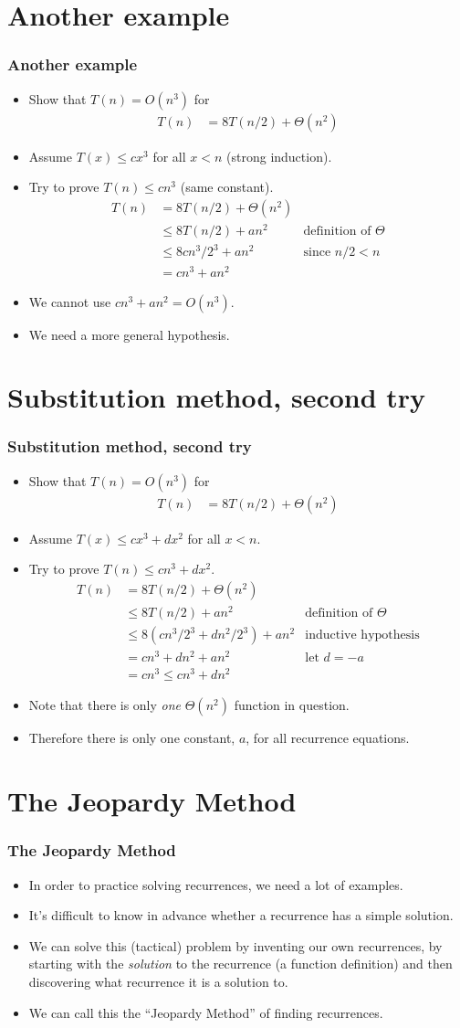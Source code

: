 \documentclass{beamer}
\newcommand{\sect}[1]{
\section{#1}
\begin{frame}[fragile]\frametitle{#1}
}
\newcommand{\bi}{\begin{itemize}}
\newcommand{\ii}{\item}
\newcommand{\ei}{\end{itemize}}
\begin{document}
\sect{Another example}
\bi
\ii
Show that $T(n) = O(n^3)$ for
\begin{align*}
  T(n) &= 8T(n/2) + \Theta(n^2)
\end{align*}
\ii
Assume $T(x) \leq cx^3$ for all $x<n$ (strong induction).
\ii
Try to prove $T(n) \leq cn^3$ (same constant).
\begin{align*}
  T(n) &= 8T(n/2) + \Theta(n^2)\\
  &\leq  8T(n/2) + an^2  &\mbox{definition of $\Theta$}\\
  &\leq 8cn^3/2^3 +  an^2 & \mbox{since $n/2 < n$}\\
  &= cn^3 +  an^2
\end{align*}
\ii
We cannot use $cn^3 +  an^2 = O(n^3)$.
\ii
We need a more general hypothesis.
\ei
\end{frame}

\sect{Substitution method, second try}
\bi
\ii
Show that $T(n) = O(n^3)$ for
\begin{align*}
  T(n) &= 8T(n/2) + \Theta(n^2)
\end{align*}
\ii
Assume $T(x) \leq cx^3 + dx^2$ for all $x<n$.
\ii
Try to prove $T(n) \leq cn^3 + dx^2$.
\begin{align*}
  T(n) &= 8T(n/2) + \Theta(n^2)\\
  &\leq  8T(n/2) + an^2  &\mbox{definition of $\Theta$}\\
  &\leq 8(cn^3/2^3 + dn^2/2^3) +  an^2 & \mbox{inductive hypothesis}\\
  &= cn^3 +  dn^2 + an^2 &\mbox{let $d = -a$}\\
  &= cn^3 \leq cn^3 + dn^2
\end{align*}
\ii
Note that there is only {\em one} $\Theta(n^2)$ function in question.
\ii
 Therefore
there is only one constant, $a$, for all recurrence equations.
\ei
\end{frame}


\sect{The Jeopardy Method}

\bi
\ii
In order to practice solving recurrences, we need a lot of
examples.
\ii
It's difficult to know in advance whether a recurrence has
a simple solution.
\ii
We can solve this (tactical) problem by inventing our
own recurrences, by starting with the {\em solution} to
the recurrence (a function definition) and then discovering
what recurrence it is a solution to.
\ii
We can call this the ``Jeopardy Method'' of finding recurrences.
\ei
\end{frame}
\end{document}

